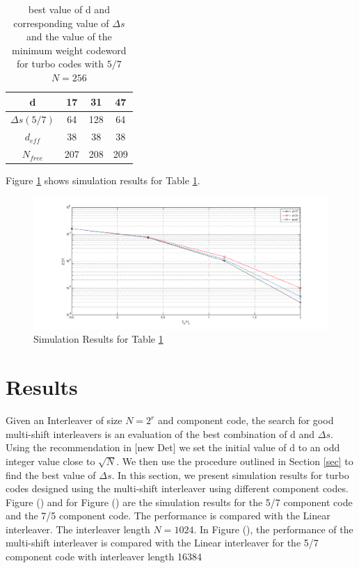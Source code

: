 \documentclass[20 pts]{article}
\begin{document}
 \begin{table}[h!]
\centering
\begin{tabular}{||c |c |c |c||} 
 \hline
 d & 17 & 31 & 47 \\ [0.5ex] 
 \hline\hline
 $\Delta s(5/7)$ & 64 & 128 & 64 \\ 
 \hline
  $d_{eff}$ & 38 & 38 & 38 \\ 
  \hline
  $N_{free}$ & 207 & 208 & 209 \\ [1ex] 
 \hline
\end{tabular}
\caption{best value of d and corresponding value of $\Delta s$ 
and the value of the minimum weight codeword for
 turbo codes with $5/7$ $N=256$}
\label{tab1}
\end{table}

 Figure \ref{comp1} shows simulation results for Table 
 \ref{tab1}.
\begin{figure}[h!]
\centering
		\includegraphics[width=\textwidth]{myInterleaver_(comparison_256)_5_7_2.png}
		\caption{Simulation Results for Table \ref{tab1}}
		\label{comp1}
		\end{figure}
		
\section{Results}
Given an Interleaver of size $N=2^r$ and component code, the search for good
multi-shift interleavers is an evaluation of the best combination of d and $\Delta s$.
Using the recommendation in [new Det] we set the initial value of d to an odd integer
value close to $\sqrt{N}$. We then use the procedure outlined in Section \ref{sec}
to find the best value of $\Delta s$. In this section, we present simulation results
for turbo codes designed using the multi-shift interleaver using different component
codes.
 Figure () and for  Figure () are the simulation results for the 5/7 component code
 and the 7/5 component code. The performance is compared with the Linear interleaver.
The interleaver length $N=1024$. In Figure (), the performance of the multi-shift 
interleaver is compared with the Linear interleaver  for the 
5/7 component code with interleaver length 16384
\end{document}
